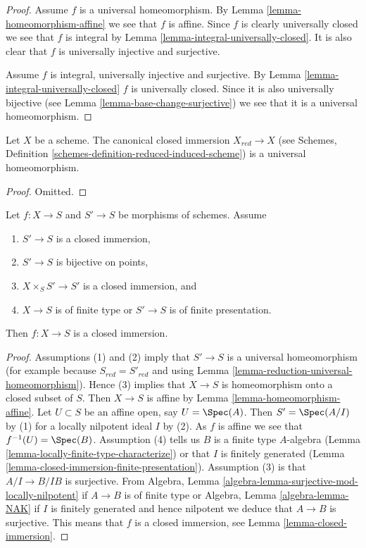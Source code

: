 \begin{proof}
Assume $f$ is a universal homeomorphism. By
Lemma \ref{lemma-homeomorphism-affine}
we see that $f$ is affine. Since $f$ is clearly universally closed we
see that $f$ is integral by
Lemma \ref{lemma-integral-universally-closed}.
It is also clear that $f$ is universally injective and surjective.

\medskip\noindent
Assume $f$ is integral, universally injective and surjective. By
Lemma \ref{lemma-integral-universally-closed}
$f$ is universally closed. Since it is also universally bijective (see
Lemma \ref{lemma-base-change-surjective})
we see that it is a universal homeomorphism.
\end{proof}

\begin{lemma}
\label{lemma-reduction-universal-homeomorphism}
Let $X$ be a scheme. The canonical closed immersion $X_{red} \to X$ (see
Schemes, Definition \ref{schemes-definition-reduced-induced-scheme})
is a universal homeomorphism.
\end{lemma}

\begin{proof}
Omitted.
\end{proof}

\begin{lemma}
\label{lemma-check-closed-infinitesimally}
Let $f : X \to S$ and $S' \to S$ be morphisms of schemes.
Assume
\begin{enumerate}
\item $S' \to S$ is a closed immersion,
\item $S' \to S$ is bijective on points,
\item $X \times_S S' \to S'$ is a closed immersion, and
\item $X \to S$ is of finite type or $S' \to S$ is of finite presentation.
\end{enumerate}
Then $f : X \to S$ is a closed immersion.
\end{lemma}

\begin{proof}
Assumptions (1) and (2) imply that $S' \to S$ is a universal homeomorphism
(for example because $S_{red} = S'_{red}$ and using
Lemma \ref{lemma-reduction-universal-homeomorphism}).
Hence (3) implies that $X \to S$ is homeomorphism onto a
closed subset of $S$. Then $X \to S$ is affine by
Lemma \ref{lemma-homeomorphism-affine}.
Let $U \subset S$ be an affine open, say $U = \Spec(A)$. Then $S' = \Spec(A/I)$
by (1) for a locally nilpotent ideal $I$ by (2). As $f$ is affine we see that
$f^{-1}(U) = \Spec(B)$.
Assumption (4) tells us $B$ is a finite type $A$-algebra
(Lemma \ref{lemma-locally-finite-type-characterize}) or
that $I$ is finitely generated
(Lemma \ref{lemma-closed-immersion-finite-presentation}).
Assumption (3) is that $A/I \to B/IB$ is surjective. From
Algebra, Lemma \ref{algebra-lemma-surjective-mod-locally-nilpotent}
if $A \to B$ is of finite type
or Algebra, Lemma \ref{algebra-lemma-NAK} if $I$ is finitely generated
and hence nilpotent we deduce that $A \to B$ is surjective.
This means that $f$ is a closed immersion, see
Lemma \ref{lemma-closed-immersion}.
\end{proof}

